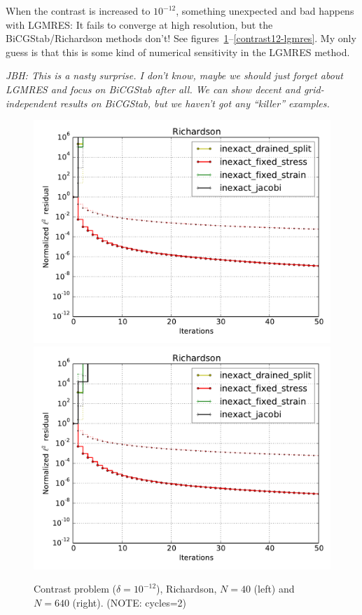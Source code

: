 \documentclass{article}
\begin{document}
\FloatBarrier

When the contrast is increased to $10^{-12}$, something unexpected and bad happens with LGMRES: It fails to converge at high resolution, but the BiCGStab/Richardson methods don't! See figures~\ref{contrast12-richardson}--\ref{contrast12-lgmres}. My only guess is that this is some kind of numerical sensitivity in the LGMRES method. 

\emph{JBH: This is a nasty surprise. I don't know, maybe we should just forget about LGMRES and focus on BiCGStab after all. We can show decent and grid-independent results on BiCGStab, but we haven't got any ``killer'' examples.}

\begin{figure}
\begin{center}
\includegraphics[width=0.49\linewidth]{../Richardson,problem=12,exact=0,N=40,cycles=2.pdf}
\includegraphics[width=0.49\linewidth]{../Richardson,problem=12,exact=0,N=640,cycles=2.pdf}
\caption{Contrast problem ($\delta=10^{-12}$), Richardson, $N=40$ (left) and $N=640$ (right). (NOTE: cycles=2)}
\label{contrast12-richardson}
\end{center}
\end{figure}
\end{document}
